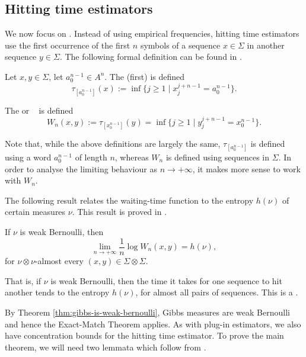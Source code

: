 \subsection{Hitting time estimators}\label{ssec:hitting-times}
We now focus on . Instead of using empirical frequencies, hitting time estimators use the first occurrence of the first $n$ symbols of a sequence $x \in \Sigma$ in another sequence $y \in \Sigma$. The following formal definition can be found in \cite[Definition 2.1]{chazottes-ugalde:hitting-times}.

\begin{definition}
	Let $x, y \in \Sigma$, let $a_0^{n - 1} \in A^n$. The (first)  is defined
	\[
		\tau_{[a_0^{n - 1}]}(x) := \inf\{j \geq 1 \mid x_j^{j + n - 1} = a_0^{n - 1}\}.
	\]
	
	The  or ~\cite[Section III.5]{shields:ergodic} is defined
	\[
		W_n(x, y) := \tau_{[x_0^{n - 1}]}(y) = \inf\{j \geq 1 \mid y_j^{j + n - 1} = x_0^{n - 1}\}.
	\]
\end{definition}

Note that, while the above definitions are largely the same, $\tau_{[a_0^{n - 1}]}$ is defined using a word $a_0^{n - 1}$ of length $n$, whereas $W_n$ is defined using sequences in $\Sigma$. In order to analyse the limiting behaviour as $n \to +\infty$, it makes more sense to work with $W_n$.

The following result relates the waiting-time function to the entropy $h(\nu)$ of certain measures $\nu$. This result is proved in \cite[Theorem III.5.1]{shields:ergodic}.

\begin{theorem}\label{thm:exact-match}
	If $\nu$ is weak Bernoulli, then
	\[
		\lim_{n \to +\infty}{\frac{1}{n}\log{W_n(x, y)}} = h(\nu),
	\]
	for $\nu \otimes \nu$-almost every $(x, y) \in \Sigma \otimes \Sigma$.
\end{theorem}

That is, if $\nu$ is weak Bernoulli, then the time it takes for one sequence to hit another tends to the entropy $h(\nu)$, for almost all pairs of sequences. This is a .

By Theorem \ref{thm:gibbs-is-weak-bernoulli}, Gibbs measures are weak Bernoulli and hence the Exact-Match Theorem applies. As with plug-in estimators, we also have concentration bounds for the hitting time estimator. To prove the main theorem, we will need two lemmata which follow from \cite[Theorem 1]{abadi:sharp}.

